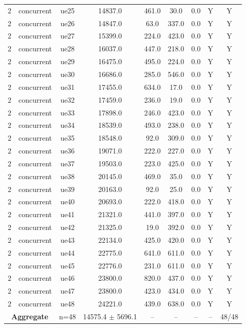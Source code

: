 \begin{table}[ht]
\begin{tabular}{|c|c|c|c|c|c|c|c|c|}
2 & concurrent & ue25 & 14837.0 & 461.0 & 30.0 & 0.0 & Y & Y \\
2 & concurrent & ue26 & 14847.0 & 63.0 & 337.0 & 0.0 & Y & Y \\
2 & concurrent & ue27 & 15399.0 & 224.0 & 423.0 & 0.0 & Y & Y \\
2 & concurrent & ue28 & 16037.0 & 447.0 & 218.0 & 0.0 & Y & Y \\
2 & concurrent & ue29 & 16475.0 & 495.0 & 224.0 & 0.0 & Y & Y \\
2 & concurrent & ue30 & 16686.0 & 285.0 & 546.0 & 0.0 & Y & Y \\
2 & concurrent & ue31 & 17455.0 & 634.0 & 17.0 & 0.0 & Y & Y \\
2 & concurrent & ue32 & 17459.0 & 236.0 & 19.0 & 0.0 & Y & Y \\
2 & concurrent & ue33 & 17898.0 & 246.0 & 423.0 & 0.0 & Y & Y \\
2 & concurrent & ue34 & 18539.0 & 493.0 & 238.0 & 0.0 & Y & Y \\
2 & concurrent & ue35 & 18548.0 & 92.0 & 309.0 & 0.0 & Y & Y \\
2 & concurrent & ue36 & 19071.0 & 222.0 & 227.0 & 0.0 & Y & Y \\
2 & concurrent & ue37 & 19503.0 & 223.0 & 425.0 & 0.0 & Y & Y \\
2 & concurrent & ue38 & 20145.0 & 469.0 & 35.0 & 0.0 & Y & Y \\
2 & concurrent & ue39 & 20163.0 & 92.0 & 25.0 & 0.0 & Y & Y \\
2 & concurrent & ue40 & 20693.0 & 222.0 & 418.0 & 0.0 & Y & Y \\
2 & concurrent & ue41 & 21321.0 & 441.0 & 397.0 & 0.0 & Y & Y \\
2 & concurrent & ue42 & 21325.0 & 19.0 & 392.0 & 0.0 & Y & Y \\
2 & concurrent & ue43 & 22134.0 & 425.0 & 420.0 & 0.0 & Y & Y \\
2 & concurrent & ue44 & 22775.0 & 641.0 & 611.0 & 0.0 & Y & Y \\
2 & concurrent & ue45 & 22776.0 & 231.0 & 611.0 & 0.0 & Y & Y \\
2 & concurrent & ue46 & 23800.0 & 820.0 & 437.0 & 0.0 & Y & Y \\
2 & concurrent & ue47 & 23800.0 & 423.0 & 434.0 & 0.0 & Y & Y \\
2 & concurrent & ue48 & 24221.0 & 439.0 & 638.0 & 0.0 & Y & Y \\
\multicolumn{2}{|c|}{\textbf{Aggregate}} & n=48 & 14575.4 $\pm$ 5696.1 & -- & -- & -- & -- & 48/48 \\

\end{tabular}
\end{table}
